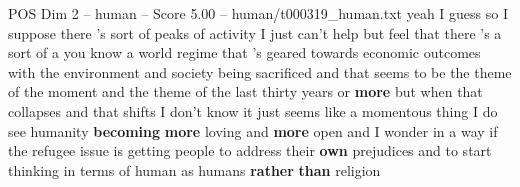 \begin{textsample}{POS Dim 2 – human – Score 5.00 – human/t000319\_human.txt}  \label{ex:f2_pos_040}
yeah I guess so I suppose there 's sort of peaks of activity I just can't help but feel that there 's a sort of a you know a world regime that 's geared towards economic outcomes with the environment and society being sacrificed and that seems to be the theme of the moment and the theme of the last thirty years or \textbf{more} but when that collapses and that shifts I don't know it just seems like a momentous thing I do see humanity \textbf{becoming} \textbf{more} loving and \textbf{more} open and I wonder in a way if the refugee issue is getting people to address their \textbf{own} prejudices and to start thinking in terms of human as humans \textbf{rather} \textbf{than} religion

\end{textsample}
